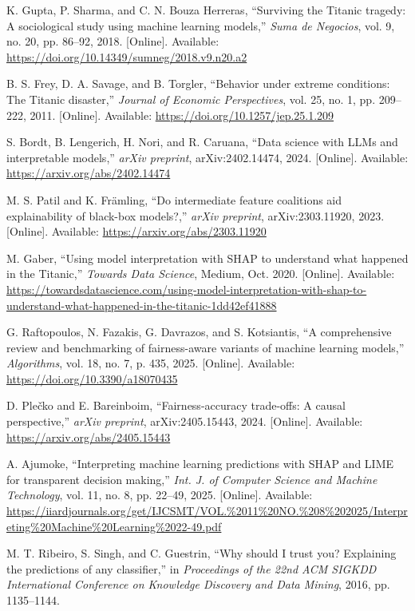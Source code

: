 \documentclass[conference]{IEEEtran}
\begin{document}
\begin{thebibliography}{00}
 K. Gupta, P. Sharma, and C. N. Bouza Herreras, ``Surviving the Titanic tragedy: A sociological study using machine learning models,'' \textit{Suma de Negocios}, vol. 9, no. 20, pp. 86--92, 2018. [Online]. Available: \url{https://doi.org/10.14349/sumneg/2018.v9.n20.a2}

 B. S. Frey, D. A. Savage, and B. Torgler, ``Behavior under extreme conditions: The Titanic disaster,'' \textit{Journal of Economic Perspectives}, vol. 25, no. 1, pp. 209--222, 2011. [Online]. Available: \url{https://doi.org/10.1257/jep.25.1.209}

 S. Bordt, B. Lengerich, H. Nori, and R. Caruana, ``Data science with LLMs and interpretable models,'' \textit{arXiv preprint}, arXiv:2402.14474, 2024. [Online]. Available: \url{https://arxiv.org/abs/2402.14474}

 M. S. Patil and K. Främling, ``Do intermediate feature coalitions aid explainability of black-box models?,'' \textit{arXiv preprint}, arXiv:2303.11920, 2023. [Online]. Available: \url{https://arxiv.org/abs/2303.11920}

 M. Gaber, ``Using model interpretation with SHAP to understand what happened in the Titanic,'' \textit{Towards Data Science}, Medium, Oct. 2020. [Online]. Available: \url{https://towardsdatascience.com/using-model-interpretation-with-shap-to-understand-what-happened-in-the-titanic-1dd42ef41888}

 G. Raftopoulos, N. Fazakis, G. Davrazos, and S. Kotsiantis, ``A comprehensive review and benchmarking of fairness-aware variants of machine learning models,'' \textit{Algorithms}, vol. 18, no. 7, p. 435, 2025. [Online]. Available: \url{https://doi.org/10.3390/a18070435}

 D. Plečko and E. Bareinboim, ``Fairness-accuracy trade-offs: A causal perspective,'' \textit{arXiv preprint}, arXiv:2405.15443, 2024. [Online]. Available: \url{https://arxiv.org/abs/2405.15443}

 A. Ajumoke, ``Interpreting machine learning predictions with SHAP and LIME for transparent decision making,'' \textit{Int. J. of Computer Science and Machine Technology}, vol. 11, no. 8, pp. 22--49, 2025. [Online]. Available: \url{https://iiardjournals.org/get/IJCSMT/VOL.%2011%20NO.%208%202025/Interpreting%20Machine%20Learning%2022-49.pdf}

 M. T. Ribeiro, S. Singh, and C. Guestrin, ``Why should I trust you? Explaining the predictions of any classifier,'' in \textit{Proceedings of the 22nd ACM SIGKDD International Conference on Knowledge Discovery and Data Mining}, 2016, pp. 1135--1144.


\end{thebibliography}
\end{document}
